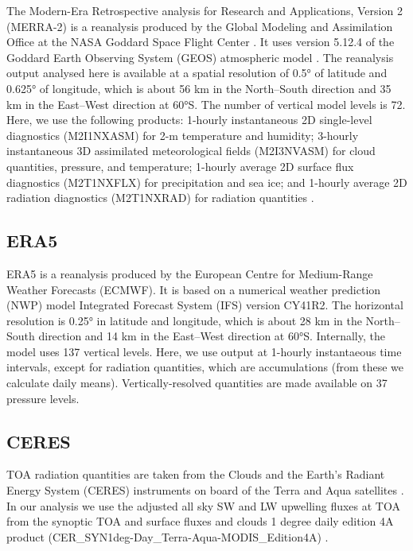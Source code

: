 \documentclass[12pt,a4paper]{article}
\begin{document}
The Modern-Era Retrospective analysis for Research and Applications, Version 2
(MERRA-2) is a reanalysis produced by the Global Modeling and Assimilation
Office at the NASA Goddard Space Flight Center \citep{gelaro2017}.  It uses
version 5.12.4 of the Goddard Earth Observing System (GEOS) atmospheric model
\citep{rienecker2008,molod2015}. The reanalysis output analysed here is
available at a spatial resolution of 0.5° of latitude and 0.625° of longitude,
which is about 56 km in the North--South direction and 35 km in the East--West
direction at 60°S. The number of vertical model levels is 72. Here, we use the
following products: 1-hourly instantaneous 2D single-level diagnostics
(M2I1NXASM) for 2-m temperature and humidity; 3-hourly instantaneous 3D
assimilated meteorological fields (M2I3NVASM) for cloud quantities, pressure,
and temperature; 1-hourly average 2D surface flux diagnostics (M2T1NXFLX) for
precipitation and sea ice; and 1-hourly average 2D radiation diagnostics
(M2T1NXRAD) for radiation quantities \citep{merra2}.

\subsection{ERA5}

ERA5 \citep{era5} is a reanalysis produced by the European Centre for
Medium-Range Weather Forecasts (ECMWF). It is based on a numerical weather
prediction (NWP) model Integrated Forecast System (IFS) version CY41R2.  The
horizontal resolution is 0.25° in latitude and longitude, which is about 28 km
in the North--South direction and 14 km in the East--West direction at 60°S.
Internally, the model uses 137 vertical levels. Here, we use output at 1-hourly
instantaeous time intervals, except for radiation quantities, which are
accumulations (from these we calculate daily means).  Vertically-resolved
quantities are made available on 37 pressure levels.

\subsection{CERES}

TOA radiation quantities are taken from the Clouds and the Earth’s Radiant
Energy System (CERES) instruments on board of the Terra and Aqua satellites
\citep{wielicki1996,loeb2018}. In our analysis we use the adjusted all sky SW
and LW upwelling fluxes at TOA from the synoptic TOA and surface fluxes and
clouds 1 degree daily edition 4A product
(CER\_SYN1deg-Day\_Terra-Aqua-MODIS\_Edition4A)
\citep{doelling2013,doelling2016}.
\end{document}
